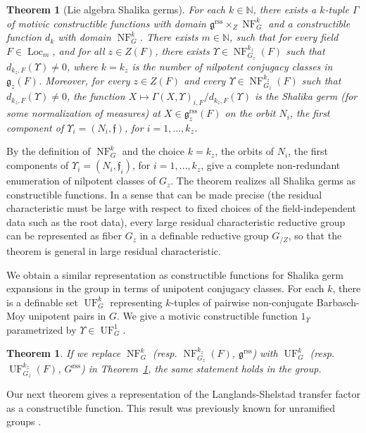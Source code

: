 \documentclass[12pt]{amsart}
\newcommand{\op}[1]{\operatorname{#1}}
\newcommand{\ring}[1]{{\mathbb #1}}
\def\NF{\op{NF}}
\def\UF{\op{UF}}
\def\Y{\Upsilon}
\def\s{{\mathfrak{f}}}
\newcommand{\fg}{\mathfrak{g}}
\newcommand{\reg}{\mathrm{rss}}
\theoremstyle{plain}
\newtheorem{theorem}[thm]{Theorem}
\theoremstyle{definition}
\begin{document}
\begin{theorem} [Lie algebra Shalika germs]\label{thm:lie-shalika} For each $k\in \ring{N}$,
  there exists a $k$-tuple $\Gamma$ of motivic constructible functions
  with domain $\fg^\reg\times_Z \NF^k_G$ and a constructible
  function $d_k$ with domain $\NF^k_G$.  There exists $m\in
  \ring{N}$, such that for every field $F\in \op{Loc}_{m}$, and for
  all $z\in Z(F)$, there exists $\Y\in \NF^{k_z}_{G_z}(F)$ such that
  $d_{k_z,F}(\Y)\ne 0$, where $k = k_z$ is the number of nilpotent
  conjugacy classes in $\fg_z(F)$.  Moreover, for every $z\in Z(F)$
  and every $\Y\in \NF^{k_z}_{G_z}(F)$ such that $d_{k_z,F}(\Y)\ne 0$,
  the function $X\mapsto \Gamma(X,\Y)_{i,F}/d_{k_z,F}(\Y)$ is the
  Shalika germ (for some normalization of measures) at $X\in
  \fg^\reg_z(F)$ on the orbit $N_i$, the first component of $\Y_i=(N_i,\s)$, for $i=1,\ldots,k_z$.
\end{theorem}

By the definition of $\NF^k_{G}$ and the choice $k=k_z$, the orbits of
$N_i$, the first components of
$\Y_i=(N_i,\s_i)$, for $i=1,\ldots,k_z$, give a complete non-redundant
enumeration of nilpotent classes of $G_z$.  The theorem realizes all
Shalika germs as constructible functions.  In a sense that can be made
precise (the residual characteristic must be large with respect to
fixed choices of the field-independent data such as the root data),
every large residual characteristic reductive group can be represented
as fiber $G_z$ in a definable reductive group $G_{/Z}$, so that the
theorem is general in large residual characteristic.

We obtain a similar representation as constructible functions for
Shalika germ expansions in the group in terms of unipotent conjugacy
classes.  For each $k$, there is a definable set $\UF^k_G$
representing $k$-tuples of pairwise non-conjugate Barbasch-Moy
unipotent pairs in $G$.  We give a motivic constructible function
$1_\Y$ parametrized by $\Y\in \UF^1_G$.

\begin{theorem} If we replace $\NF^k_G$ (resp. $\NF^{k_z}_{G_z}(F)$,
  $\fg^\reg$) with $\UF^k_{G}$ (resp. $\UF^{k_z}_{G_z}(F)$, $G^\reg$)
  in Theorem~\ref{thm:lie-shalika}, the same statement holds in the
  group.
\end{theorem}

Our next theorem gives a representation of the Langlands-Shelstad
transfer factor as a constructible function.  This result was
previously known for unramified groups \cite{CHL}.
\end{document}
